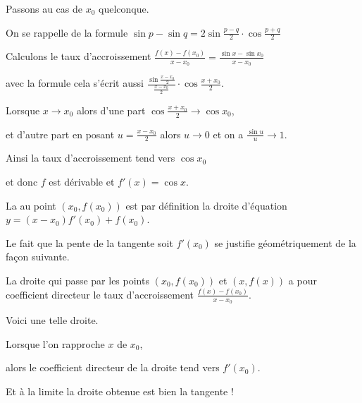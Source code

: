 \change

Passons au cas de $x_0$ quelconque.

\change

On se rappelle de la formule 
$\sin p-\sin q = 2\sin \frac{p-q}{2}\cdot\cos\frac{p+q}{2}$

\change

Calculons le taux d'accroissement 
$\frac{f(x)-f(x_0)}{x-x_0} = \frac{\sin x - \sin x_0}{x-x_0}$

avec la formule cela s'écrit aussi 
$\frac{\sin \frac{x-x_0}{2}}{\frac{x-x_0}{2}} \cdot \cos \frac{x+x_0}{2}$.

\change

Lorsque $x\to x_0$ alors d'une part
$\cos \frac{x+x_0}{2}\to \cos x_0$,

\change

et d'autre part
en posant $u=\frac{x-x_0}{2}$ alors $u\to 0$ et on a $\frac {\sin u}u \to 1$.

\change

Ainsi la taux d'accroissement tend vers $\cos x_0$ 

\change

et donc $f$ est dérivable et $f'(x)=\cos x$.



\diapo

La  au point $(x_0,f(x_0))$ est par définition
la droite d'équation $y = (x-x_0) f'(x_0) + f(x_0)$.



Le fait que la pente de la tangente soit $f'(x_0)$ se justifie géométriquement de la façon suivante.


\change
La droite qui passe par les points $(x_0,f(x_0))$ et $(x,f(x))$
a pour coefficient directeur le taux d'accroissement $\frac{f(x)-f(x_0)}{x-x_0}$.

\change

Voici une telle droite.

Lorsque l'on rapproche $x$ de $x_0$,

\change

\change

alors le coefficient directeur de la droite
tend vers $f'(x_0)$.


\change

\change

Et à la limite la droite obtenue est bien la tangente !


\diapo

